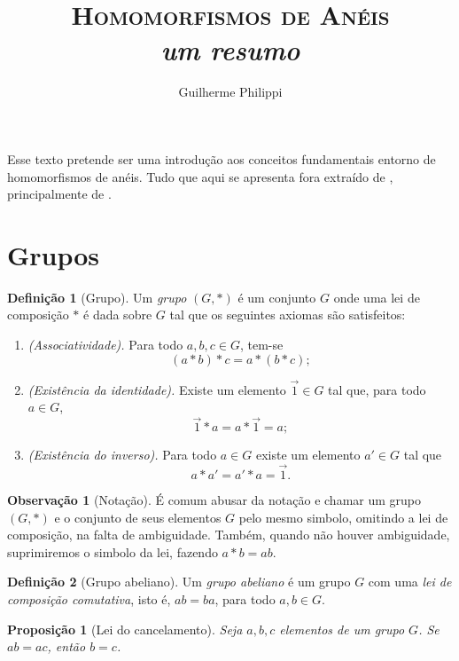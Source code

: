 \documentclass[a4paper,12pt]{article}
\title{\textsc{Homomorfismos de Anéis}\\ \textsl{um resumo}}
\author{Guilherme Philippi}
\theoremstyle{plain}
\newtheorem{proposicao}{Proposição}[section]
\theoremstyle{definition}
\newtheorem{definicao}{Definição}[section]
\newtheorem{observacao}{Observação}[section]
\begin{document}
	\maketitle
	
	Esse texto pretende ser uma introdução aos conceitos fundamentais entorno de homomorfismos de anéis. Tudo que aqui se apresenta fora extraído de \cite{johnAlgebra, michalAlgebra, dominguesAlgebra}, principalmente de \cite{dominguesAlgebra}.
	
	\section{Grupos}
	
	\begin{definicao}[Grupo]
		Um \emph{grupo} $(G,*)$ é um conjunto \(G\) onde uma lei de
		composição $*$ é dada sobre \(G\) tal que os seguintes axiomas são satisfeitos:
		
		\begin{enumerate}
			\item \emph{(Associatividade).} Para todo $a,b,c \in G$, tem-se $$(a*b)*c = a*(b*c);$$
			\item \emph{(Existência da identidade).} Existe um elemento $\vec{1}\in G$ tal que, para todo $a\in G$, $$\vec{1}*a = a*\vec{1} = a;$$
			\item \emph{(Existência do inverso).} Para todo $a\in G$ existe um elemento $a'\in G$ tal que $$a*a' = a'*a = \vec{1}.$$
		\end{enumerate}
	\end{definicao}

	\begin{observacao}[Notação]
		É comum abusar da notação e chamar um grupo $(G,*)$ e o conjunto de	seus elementos $G$ pelo mesmo simbolo, omitindo a lei de composição, na falta de ambiguidade. Também, quando não houver ambiguidade, suprimiremos o simbolo da lei, fazendo $a*b = ab$.
	\end{observacao}
	
	\begin{definicao}[Grupo abeliano]
		Um \emph{grupo abeliano} é um grupo $G$ com uma \emph{lei de
		composição comutativa}, isto é, $ab = ba$, para todo $a,b \in G$.
	\end{definicao}

	\begin{proposicao}[Lei do cancelamento]
		Seja \(a,b,c\) elementos de um grupo \(G\). Se \(ab = ac\), então \(b = c\).
	\end{proposicao} 
\end{document}
